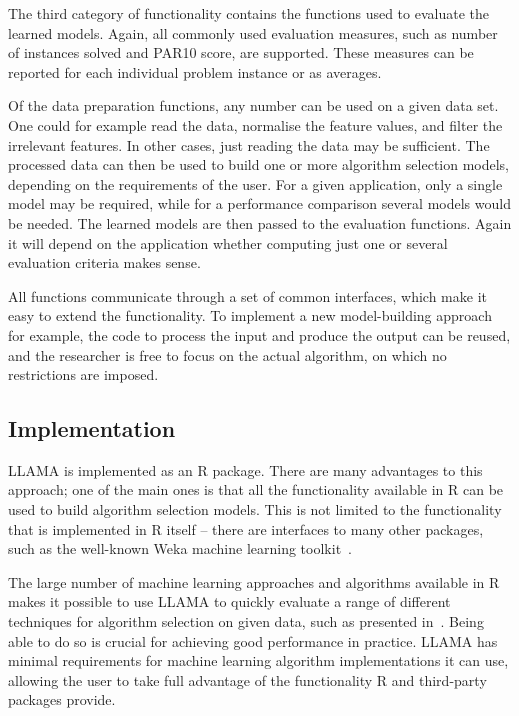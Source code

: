 \documentclass{article}\usepackage[]{graphicx}\usepackage[]{color}
\begin{document}
The third category of functionality contains the functions used to evaluate the
learned models. Again, all commonly used evaluation measures, such as number of
instances solved and PAR10 score, are supported. These measures can be reported
for each individual problem instance or as averages.

Of the data preparation functions, any number can be used on a given data set.
One could for example read the data, normalise the feature values, and filter
the irrelevant features. In other cases, just reading the data may be
sufficient. The processed data can then be used to build one or more algorithm
selection models, depending on the requirements of the user. For a given
application, only a single model may be required, while for a performance
comparison several models would be needed. The learned models are then passed to
the evaluation functions. Again it will depend on the application whether
computing just one or several evaluation criteria makes sense.

All functions communicate through a set of common interfaces, which make it easy
to extend the functionality. To implement a new model-building approach for
example, the code to process the input and produce the output can be reused, and
the researcher is free to focus on the actual algorithm, on which no
restrictions are imposed.

\subsection{Implementation}

LLAMA is implemented as an R package. There are many advantages to this
approach; one of the main ones is that all the functionality available in R can
be used to build algorithm selection models. This is not limited to the
functionality that is implemented in R itself -- there are interfaces to many
other packages, such as the well-known Weka machine learning
toolkit~\cite{hall_weka_2009}.

The large number of machine learning approaches and algorithms available in R
makes it possible to use LLAMA to quickly evaluate a range of different
techniques for algorithm selection on given data, such as presented
in~\cite{kotthoff_evaluation_2012}. Being able to do so is crucial for achieving
good performance in practice. LLAMA has minimal requirements for machine
learning algorithm implementations it can use, allowing the user to take full
advantage of the functionality R and third-party packages provide.
\end{document}
